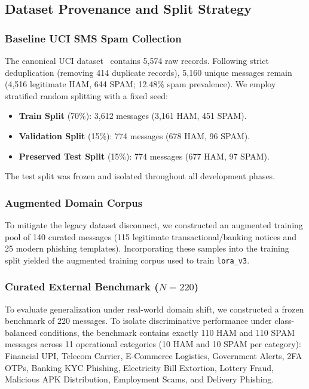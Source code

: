 \documentclass[conference]{IEEEtran}
\begin{document}
\subsection{Dataset Provenance and Split Strategy}
\subsubsection{Baseline UCI SMS Spam Collection}
The canonical UCI dataset~\cite{almeida2011sms} contains 5,574 raw records. Following strict deduplication (removing 414 duplicate records), 5,160 unique messages remain (4,516 legitimate HAM, 644 SPAM; 12.48\% spam prevalence). We employ stratified random splitting with a fixed seed:
\begin{itemize}
    \item \textbf{Train Split} (70\%): 3,612 messages (3,161 HAM, 451 SPAM).
    \item \textbf{Validation Split} (15\%): 774 messages (678 HAM, 96 SPAM).
    \item \textbf{Preserved Test Split} (15\%): 774 messages (677 HAM, 97 SPAM).
\end{itemize}
The test split was frozen and isolated throughout all development phases.

\subsubsection{Augmented Domain Corpus}
To mitigate the legacy dataset disconnect, we constructed an augmented training pool of 140 curated messages (115 legitimate transactional/banking notices and 25 modern phishing templates). Incorporating these samples into the training split yielded the augmented training corpus used to train \texttt{lora\_v3}.

\subsubsection{Curated External Benchmark ($N=220$)}
To evaluate generalization under real-world domain shift, we constructed a frozen benchmark of 220 messages. To isolate discriminative performance under class-balanced conditions, the benchmark contains exactly 110 HAM and 110 SPAM messages across 11 operational categories (10 HAM and 10 SPAM per category): Financial UPI, Telecom Carrier, E-Commerce Logistics, Government Alerts, 2FA OTPs, Banking KYC Phishing, Electricity Bill Extortion, Lottery Fraud, Malicious APK Distribution, Employment Scams, and Delivery Phishing.
\end{document}
